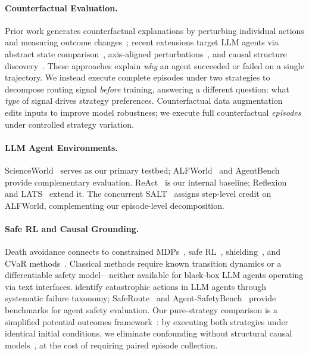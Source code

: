 \paragraph{Counterfactual Evaluation.}
Prior work generates counterfactual explanations by perturbing individual actions and measuring outcome changes~\citep{olson2021counterfactual,gajcin2023counterfactual,amitai2024explaining}; recent extensions target LLM agents via abstract state comparison~\citep{pona2025abstract}, axis-aligned perturbations~\citep{axis-2026}, and causal structure discovery~\citep{cso-2026}. These approaches explain \emph{why} an agent succeeded or failed on a single trajectory. We instead execute complete episodes under two strategies to decompose routing signal \emph{before} training, answering a different question: what \emph{type} of signal drives strategy preferences. Counterfactual data augmentation~\citep{kaushik2020learning} edits inputs to improve model robustness; we execute full counterfactual \emph{episodes} under controlled strategy variation.

\paragraph{LLM Agent Environments.}
ScienceWorld~\citep{scienceworld-2022} serves as our primary testbed; ALFWorld~\citep{alfworld-2021} and AgentBench~\citep{agentbench-2024} provide complementary evaluation. ReAct~\citep{react-2023} is our internal baseline; Reflexion~\citep{reflexion-2023} and LATS~\citep{lats-2024} extend it. The concurrent SALT~\citep{salt-2026} assigns step-level credit on ALFWorld, complementing our episode-level decomposition.

\paragraph{Safe RL and Causal Grounding.}
Death avoidance connects to constrained MDPs~\citep{altman1999constrained}, safe RL~\citep{garcia2015comprehensive,achiam2017cpo,moldovan2012safe}, shielding~\citep{alshiekh2018safe}, and CVaR methods~\citep{chow2015risk,tamar2015optimizing}. Classical methods require known transition dynamics or a differentiable safety model---neither available for black-box LLM agents operating via text interfaces. \citet{ruan2024failures} identify catastrophic actions in LLM agents through systematic failure taxonomy; SafeRoute~\citep{saferoute-2025} and Agent-SafetyBench~\citep{agent-safetybench-2024} provide benchmarks for agent safety evaluation. Our pure-strategy comparison is a simplified potential outcomes framework~\citep{rubin1974estimating}: by executing both strategies under identical initial conditions, we eliminate confounding without structural causal models~\citep{pearl2009causality}, at the cost of requiring paired episode collection.